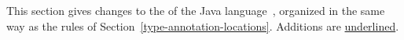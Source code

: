 \documentclass[10pt]{article}
\begin{document}
This section
gives changes to the  of the Java
language~\cite[ch.~18]{GoslingJSBB2012}, organized in the same way as
the rules of Section~\ref{type-annotation-locations}.
Additions are \underline{underlined}.






\newcommand{\term}[1]{\code{#1}}         %
\newcommand{\nt}[1]{\emph{#1}}           %
\newcommand{\opt}[1]{\emph{[}#1\emph{]}} %
\newcommand{\multi}[1]{\emph{\{}#1\emph{\}}} %
\newcommand{\alt}[1]{\emph{(}#1\emph{)}} %
\newcommand{\altor}[1]{\ensuremath{\mathit{|}}} %
\newcommand{\new}[1]{\underline{#1}}     %

\newcommand{\basictypename}{\alt{ \term{byte} \altor{} \term{short} \altor{} \term{char} \altor{} \term{int} \altor{} \term{long} \altor{} \term{float} \altor{} \term{double} \altor{} \term{boolean} }}
\end{document}
